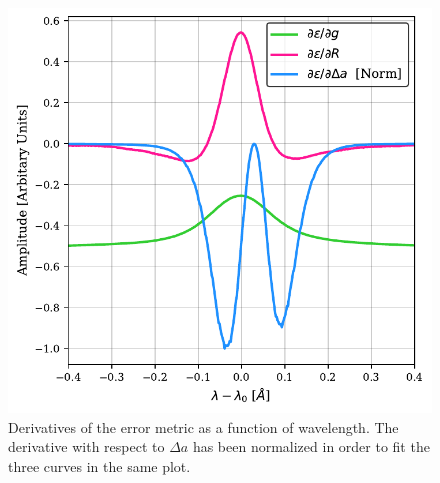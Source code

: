 \begin{figure}
  \begin{minipage}[c]{0.6\textwidth}
    \includegraphics[width=\textwidth]{figures/EtalonPaper/Derivadas.pdf}
  \end{minipage}\hfill
  \begin{minipage}[c]{0.37\textwidth}
    \caption{
      Derivatives of the error metric as a function of wavelength. The derivative with respect to $\Delta a$ has been normalized in order to fit the three curves in the same plot. \label{fig_etalon_corr: Derivatives}} 
  \end{minipage}
\end{figure}


